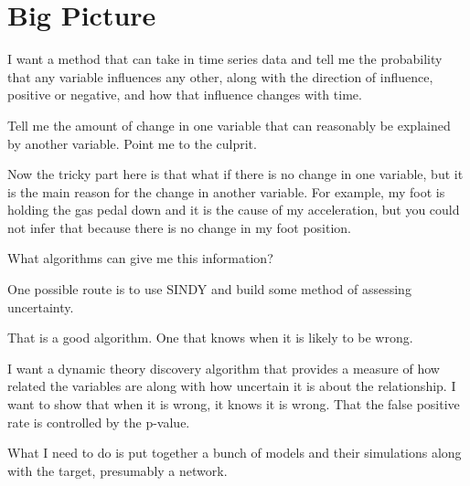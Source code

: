 \documentclass{article}
\begin{document}
        \section{Big Picture}

        I want a method that can take in time series data and tell me the probability that
        any variable influences any other, along with the direction of influence, positive
        or negative, and how that influence changes with time.

        Tell me the amount of change in one variable that can reasonably be explained by
        another variable. Point me to the culprit.

        Now the tricky part here is that what if there is no change in one variable,
        but it is the main reason for the change in another variable. For example,
        my foot is holding the gas pedal down and it is the cause of my acceleration, but
        you could not infer that because there is no change in my foot position.

        What algorithms can give me this information?

        One possible route is to use SINDY and build some method of assessing uncertainty.

        That is a good algorithm. One that knows when it is likely to be wrong.

        I want a dynamic theory discovery algorithm that provides a measure of how related 
        the variables are along with how uncertain it is about the relationship. I want
        to show that when it is wrong, it knows it is wrong. That the false positive rate 
        is controlled by the p-value.

        What I need to do is put together a bunch of models and their simulations along with
        the target, presumably a network.
    
            
\end{document}
